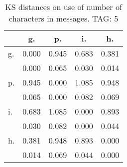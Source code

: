 \begin{table}[h!]
\begin{center}
\begin{tabular}{| l | c | c | c | c |}\hline
 & g. & p. & i. & h. \\\hline
g. & 0.000  & 0.945  & 0.683  & 0.381 \\\hline
 & 0.000  & 0.065  & 0.030  & 0.014 \\\hline
p. & 0.945  & 0.000  & 1.085  & 0.948 \\\hline
 & 0.065  & 0.000  & 0.082  & 0.069 \\\hline
i. & 0.683  & 1.085  & 0.000  & 0.893 \\\hline
 & 0.030  & 0.082  & 0.000  & 0.044 \\\hline
h. & 0.381  & 0.948  & 0.893  & 0.000 \\\hline
 & 0.014  & 0.069  & 0.044  & 0.000 \\\hline
\end{tabular}
\caption{KS distances on use of number of characters in messages. TAG: 5}
\end{center}
\end{table}